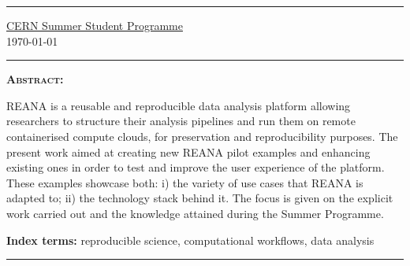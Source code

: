 \begin{center}
\begin{center}
\end{center}
\vspace{4mm}


\hrule
\vspace{3mm}
\href{https://home.cern/summer-student-programme}{CERN Summer Student Programme}\\
\vspace{2mm}
\large{\today}
\vspace{4mm}
\hrule
\vspace{3mm}
\begin{center}
\large{\textbf{\textsc{Abstract:}}}
\end{center}

\vspace{1mm} 
\justify
\begin{center}
    \begin{minipage}[t]{0.8\textwidth}
\normalsize{
\justify
REANA is a reusable and reproducible data analysis platform allowing researchers to structure their analysis pipelines and run them on remote containerised compute clouds, for preservation and reproducibility purposes. The present work aimed at creating new REANA pilot examples and enhancing existing ones in order to test and improve the user experience of the platform. These examples showcase both: i) the variety of use cases that REANA is adapted to; ii) the technology stack behind it. The focus is given on the explicit work carried out and the knowledge attained during the Summer Programme.
}
    \end{minipage}

    \begin{minipage}[t]{0.8\textwidth}
\normalsize{
\justify
\textbf{Index terms:} reproducible science, computational workflows, data analysis
}
    \end{minipage}

\end{center}

\vspace{6mm} 

\hrule

\end{center}
